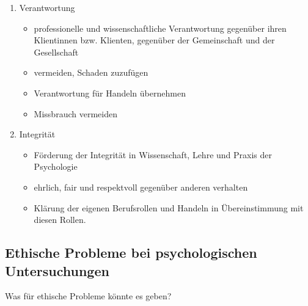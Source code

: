 \documentclass[
]{book}
\providecommand{\tightlist}{%
  \setlength{\itemsep}{0pt}\setlength{\parskip}{0pt}}
\begin{document}
\begin{enumerate}
\def\labelenumi{\arabic{enumi}.}
\setcounter{enumi}{2}
\item
  Verantwortung

  \begin{itemize}
  \tightlist
  \item
    professionelle und wissenschaftliche Verantwortung gegenüber ihren Klientinnen bzw. Klienten, gegenüber der Gemeinschaft und der Gesellschaft\\
  \item
    vermeiden, Schaden zuzufügen\\
  \item
    Verantwortung für Handeln übernehmen\\
  \item
    Missbrauch vermeiden
  \end{itemize}
\item
  Integrität

  \begin{itemize}
  \tightlist
  \item
    Förderung der Integrität in Wissenschaft, Lehre und Praxis der Psychologie\\
  \item
    ehrlich, fair und respektvoll gegenüber anderen verhalten\\
  \item
    Klärung der eigenen Berufsrollen und Handeln in Übereinstimmung mit diesen Rollen.
  \end{itemize}
\end{enumerate}

\hypertarget{ethische-probleme-bei-psychologischen-untersuchungen}{%
\subsection{Ethische Probleme bei psychologischen Untersuchungen}\label{ethische-probleme-bei-psychologischen-untersuchungen}}

Was für ethische Probleme könnte es geben?
\end{document}
